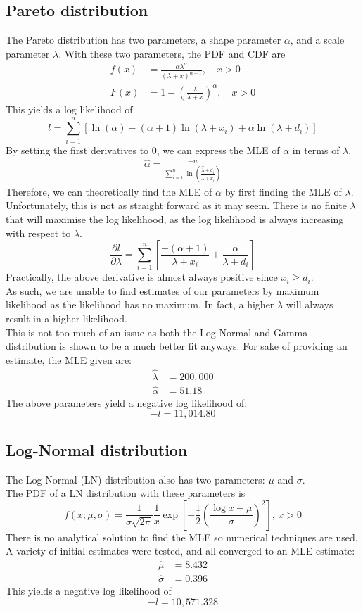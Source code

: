 \documentclass[titlepage]{article}
\begin{document}
	\subsection{Pareto distribution}
	The Pareto distribution has two parameters, a shape parameter $ \alpha $, and a scale parameter $ \lambda $. With these two parameters, the PDF and CDF are 
	\begin{align*}
		f(x) &= \frac{\alpha \lambda^\alpha}{(\lambda+x)^{\alpha + 1}}, \quad x > 0\\
		F(x) &= 1-\left(\frac{\lambda}{\lambda + x}\right)^\alpha, \quad x > 0
	\end{align*}
	This yields a log likelihood of
	$$ l=\sum_{i=1}^{n}\left[\ln(\alpha) - (\alpha + 1)\ln(\lambda + x_i) + \alpha\ln(\lambda+d_i)\right]$$
	By setting the first derivatives to 0, we can express the MLE of $\alpha$ in terms of $\lambda$.
	\begin{align}
	\hat{\alpha} = \frac{-n}{\sum_{i=1}^{n}\ln\left(\frac{\hat{\lambda} + d_i}{\hat{\lambda}+x_i}\right)} \label{pareto_dl_da}
	\end{align}
	Therefore, we can theoretically find the MLE of $\alpha$ by first finding the MLE of $\lambda$. Unfortunately, this is not as straight forward as it may seem. There is no finite $\lambda$ that will maximise the log likelihood, as the log likelihood is always increasing with respect to $\lambda$.
	$$\frac{\partial l}{\partial\lambda}=\sum_{i=1}^{n}\left[\frac{-(\alpha+1)}{\lambda+x_i}+\frac{\alpha}{\lambda+d_i}\right]$$
	Practically, the above derivative is almost always positive since $x_i \geq d_i$.\\
	As such, we are unable to find estimates of our parameters by maximum likelihood as the likelihood has no maximum. In fact, a higher $\lambda$ will always result in a higher likelihood.\\
	This is not too much of an issue as both the Log Normal and Gamma distribution is shown to be a much better fit anyways. For sake of providing an estimate, the MLE given are:
	\begin{align*}
		\hat{\lambda} &= 200,000\\
		\hat{\alpha} &= 51.18
	\end{align*}
	The above parameters yield a negative log likelihood of:
	$$-l = 11,014.80$$
	
	
	\subsection{Log-Normal distribution}
	The Log-Normal (LN) distribution also has two parameters: $\mu$ and $ \sigma$.\\
	The PDF of a LN distribution with these parameters is
	$$f(x; \mu, \sigma) = \frac{1}{\sigma \sqrt{2\pi}}\frac{1}{x}\exp\left[-\frac{1}{2}\left(\frac{\log x-\mu}{\sigma}\right)^2\right], \, x>0$$
	There is no analytical solution to find the MLE so numerical techniques are used. A variety of initial estimates were tested, and all converged to an MLE estimate:
	\begin{align*}
		\hat{\mu} &= 8.432\\
		\hat{\sigma} &= 0.396
	\end{align*}
	This yields a negative log likelihood of
	$$ -l = 10,571.328$$
	
\end{document}
